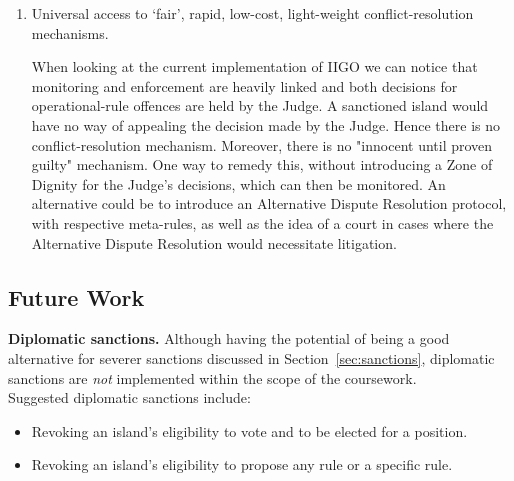 \begin{enumerate}
    \item Universal access to ‘fair’, rapid, low-cost, light-weight conflict-resolution mechanisms.
    
    When looking at the current implementation of IIGO we can notice that monitoring and enforcement are heavily linked and both decisions for operational-rule offences are held by the Judge. A sanctioned island would have no way of appealing the decision made by the Judge. Hence there is no conflict-resolution mechanism. Moreover, there is no "innocent until proven guilty" mechanism. One way to remedy this, without introducing a Zone of Dignity for the Judge's decisions, which can then be monitored. An alternative could be to introduce an Alternative Dispute Resolution protocol, with respective meta-rules, as well as the idea of a court in cases where the Alternative Dispute Resolution would necessitate litigation. 

\end{enumerate}
\subsection{Future Work}

\textbf{Diplomatic sanctions.} Although having the potential of being a good alternative for severer sanctions discussed in  Section~\ref{sec:sanctions}, diplomatic sanctions are \emph{not} implemented within the scope of the coursework. \\
    Suggested diplomatic sanctions include:
        \begin{itemize}
            \item Revoking an island's eligibility to vote and to be elected for a position.
            \item Revoking an island's eligibility to propose any rule or a specific rule.
        \end{itemize}

